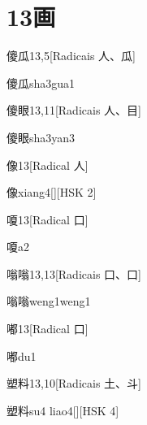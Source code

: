
\section*{13画}

\begin{entry}{傻瓜}{13,5}[Radicais ⼈、⽠]
  \begin{phonetics}{傻瓜}{sha3gua1}
  \end{phonetics}
\end{entry}

\begin{entry}{傻眼}{13,11}[Radicais ⼈、⽬]
  \begin{phonetics}{傻眼}{sha3yan3}
  \end{phonetics}
\end{entry}

\begin{entry}{像}{13}[Radical ⼈]
  \begin{phonetics}{像}{xiang4}[][HSK 2]
  \end{phonetics}
\end{entry}

\begin{entry}{嗄}{13}[Radical ⼝]
  \begin{phonetics}{嗄}{a2}
  \end{phonetics}
\end{entry}

\begin{entry}{嗡嗡}{13,13}[Radicais ⼝、⼝]
  \begin{phonetics}{嗡嗡}{weng1weng1}
  \end{phonetics}
\end{entry}

\begin{entry}{嘟}{13}[Radical ⼝]
  \begin{phonetics}{嘟}{du1}
  \end{phonetics}
\end{entry}

\begin{entry}{塑料}{13,10}[Radicais ⼟、⽃]
  \begin{phonetics}{塑料}{su4 liao4}[][HSK 4]
  \end{phonetics}
\end{entry}

